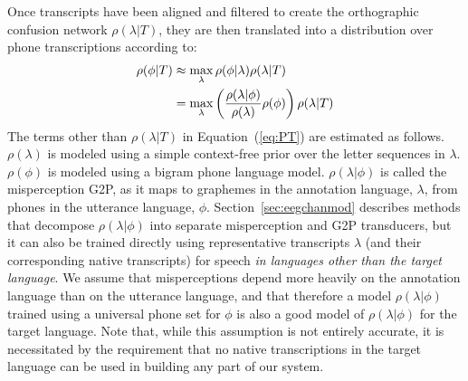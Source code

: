 Once transcripts have
been aligned and filtered to create the orthographic confusion network
$\rho(\lambda|T)$, they are then translated into a distribution over
phone transcriptions according to:
\begin{align}
  \rho(\phi|T) 
  &\approx \max_{\lambda}  \rho(\phi|\lambda) \rho(\lambda|T) \notag \\
  &= \max_{\lambda}  \left(\frac{\rho(\lambda|\phi)}{\rho(\lambda)}
  \rho(\phi)\right) \rho(\lambda|T) 
\label{eq:PT}
\end{align}
The terms other than $\rho(\lambda|T)$ in Equation~(\ref{eq:PT}) are
estimated as follows.  $\rho(\lambda)$ is modeled using a simple
context-free prior over the letter sequences in $\lambda$.
$\rho(\phi)$ is modeled using a bigram phone language model.
$\rho(\lambda|\phi)$ is called the misperception G2P, as it maps to
graphemes in the annotation language, $\lambda$, from phones in the
utterance language, $\phi$.  Section~\ref{sec:eegchanmod} describes
methods that decompose $\rho(\lambda|\phi)$ into separate
misperception and G2P transducers, but it can also be trained directly
using
representative transcripts $\lambda$ (and their
corresponding native transcripts) for speech {\em in languages other
than the target language}. We assume that misperceptions depend more
heavily on the annotation language than on the utterance language, and
that therefore a model $\rho(\lambda|\phi)$ trained using a universal
phone set for $\phi$ is also a good model of $\rho(\lambda|\phi)$ for
the target language. Note that, while this assumption is not entirely
accurate, it is necessitated by the requirement that no native
transcriptions in the target language can be used in building any part
of our system.

